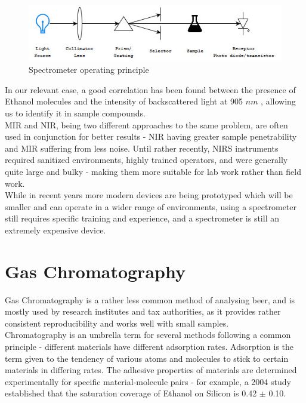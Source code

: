 \documentclass[twoside]{ctuthesis}
\theoremstyle{plain}
\theoremstyle{definition}
\theoremstyle{note}
\begin{document}
\begin{figure}[H]
	\centering
	\includegraphics[width = \textwidth]{spectrometer_scheme}
	\caption{Spectrometer operating principle}
\end{figure}

In our relevant case, a good correlation has been found between the presence of Ethanol molecules and the intensity of backscattered light at 905 $nm$  \cite{NIR_Spectroscopy_Ethanol}, allowing us to identify it in sample compounds.\\
MIR and NIR, being two different approaches to the same problem, are often used in conjunction for better results - NIR having greater sample penetrability and MIR suffering from less noise.
Until rather recently, NIRS instruments required sanitized environments, highly trained operators, and were generally quite large and bulky - making them more suitable for lab work rather than field work\cite{NIR_For_Spices}.\\ While in recent years more modern devices are being prototyped which will be smaller and can operate in a wider range of environments, using a spectrometer still requires specific training and experience, and a spectrometer is still an extremely expensive device.

\section{Gas Chromatography}
Gas Chromatography is a rather less common method of analysing beer, and is mostly used by research institutes and tax authorities, as it provides rather consistent reproducibility and works well with small samples.\\
Chromatography is an umbrella term for several methods following a common principle - different materials have different adsorption rates. Adsorption is the term given to the tendency of various atoms and molecules to stick to certain materials in differing rates. The adhesive properties of materials are determined experimentally for specific material-molecule pairs - for example, a 2004 study established that the saturation coverage of Ethanol on Silicon is 0.42 $\pm$ 0.10.\cite{Ehtnaol_adsorption,Gas_Chromatography_beer}\\
\end{document}
